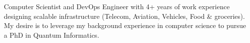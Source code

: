 \small
Computer Scientist and DevOps Engineer with 4+ years of work experience designing scalable infrastructure (Telecom, Aviation, Vehicles, Food & groceries). My desire is to leverage my background experience in computer science to pursue a PhD in Quantum Informatics.
